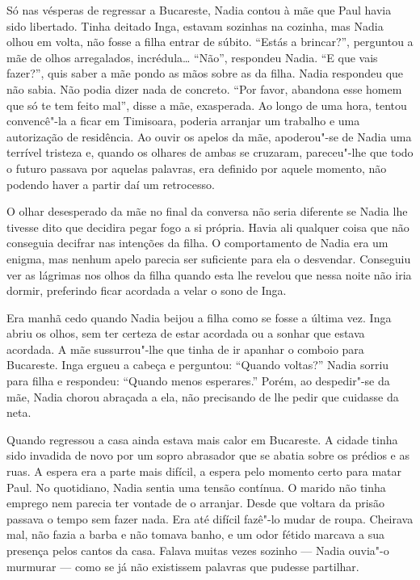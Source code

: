 Só nas vésperas de regressar a Bucareste, Nadia contou à mãe que Paul
havia sido libertado. Tinha deitado Inga, estavam sozinhas na cozinha,
mas Nadia olhou em volta, não fosse a filha entrar de súbito. ``Estás a
brincar?'', perguntou a mãe de olhos arregalados, incrédula\ldots{}
``Não'', respondeu Nadia. ``E que vais fazer?'', quis saber a mãe pondo as
mãos sobre as da filha. Nadia respondeu que não sabia. Não podia dizer
nada de concreto. ``Por favor, abandona esse homem que só te tem feito
mal'', disse a mãe, exasperada. Ao longo de uma hora, tentou convencê"-la
a ficar em Timisoara, poderia arranjar um trabalho e uma autorização de
residência. Ao ouvir os apelos da mãe, apoderou"-se de Nadia uma terrível
tristeza e, quando os olhares de ambas se cruzaram, pareceu"-lhe que todo
o futuro passava por aquelas palavras, era definido por aquele momento,
não podendo haver a partir daí um retrocesso.

O olhar desesperado da mãe no final da conversa não
seria diferente se Nadia lhe tivesse dito que decidira pegar
fogo a si própria. Havia ali qualquer coisa que não conseguia decifrar
nas intenções da filha. O comportamento de Nadia era um enigma, mas
nenhum apelo parecia ser suficiente para ela o desvendar. Conseguiu ver
as lágrimas nos olhos da filha quando esta lhe revelou que nessa noite
não iria dormir, preferindo ficar acordada a velar o sono de Inga.

Era manhã cedo quando Nadia beijou a filha como se fosse a última vez.
Inga abriu os olhos, sem ter certeza de estar acordada ou a sonhar que
estava acordada. A mãe sussurrou"-lhe que tinha de ir apanhar o comboio
para Bucareste. Inga ergueu a cabeça e perguntou: ``Quando voltas?'' Nadia
sorriu para filha e respondeu: ``Quando menos esperares.'' Porém, ao
despedir"-se da mãe, Nadia chorou abraçada a ela, não precisando de lhe
pedir que cuidasse da neta.

\bigskip

Quando regressou a casa ainda estava mais calor em Bucareste. A cidade
tinha sido invadida de novo por um sopro abrasador que se abatia sobre
os prédios e as ruas. A espera era a parte mais difícil, a espera pelo
momento certo para matar Paul. No quotidiano, Nadia sentia uma tensão
contínua. O marido não tinha emprego nem parecia ter vontade de o
arranjar. Desde que voltara da prisão passava o tempo sem fazer nada.
Era até difícil fazê"-lo mudar de roupa. Cheirava mal, não fazia a barba
e não tomava banho, e um odor fétido marcava a sua presença pelos cantos
da casa. Falava muitas vezes sozinho --- Nadia ouvia"-o murmurar --- como
se já não existissem palavras que pudesse partilhar.

